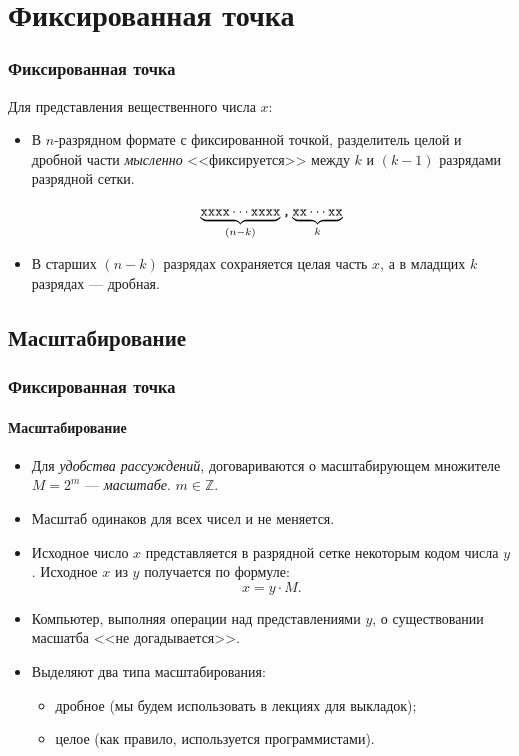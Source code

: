\section{Фиксированная точка}


\begin{frame}
    \frametitle{Фиксированная точка}

    Для представления вещественного числа $x$:
    \begin{itemize}
        \item В $n$-разрядном формате с фиксированной точкой, разделитель целой и дробной части \emph{мысленно} <<фиксируется>> между $k$ и $(k-1)$ разрядами разрядной сетки.
        
        \[\underbrace{\texttt{xxxx}\cdots\texttt{xxxx}}_{(n-k)}\texttt{,}\underbrace{\texttt{xx}\cdots\texttt{xx}}_{k}\]
        
        \item В старших $(n-k)$ разрядах сохраняется целая часть $x$, а в младщих $k$ разрядах --- дробная.
    \end{itemize}
\end{frame}


\subsection{Масштабирование}

\begin{frame}
    \frametitle{Фиксированная точка}
    \framesubtitle{Масштабирование}
    
    \begin{itemize}
        \item Для \emph{удобства рассуждений}, договариваются о масштабирующем множителе $M=2^m$ --- \emph{масштабе}. $m\in\mathbb{Z}$.
        
        \item Масштаб одинаков для всех чисел и не меняется.
        
        \item Исходное число $x$ представляется в разрядной сетке некоторым кодом числа $y$. Исходное $x$ из $y$ получается по формуле:
        \[
            x = y\cdot M.
        \]

        \item Компьютер, выполняя операции над представлениями $y$, о существовании масшатба <<не догадывается>>.
        
        \item Выделяют два типа масштабирования:
        
        \begin{itemize}
            \item дробное (мы будем использовать в лекциях для выкладок);
            \item целое (как правило, используется программистами).
        \end{itemize}
    \end{itemize}
\end{frame}

